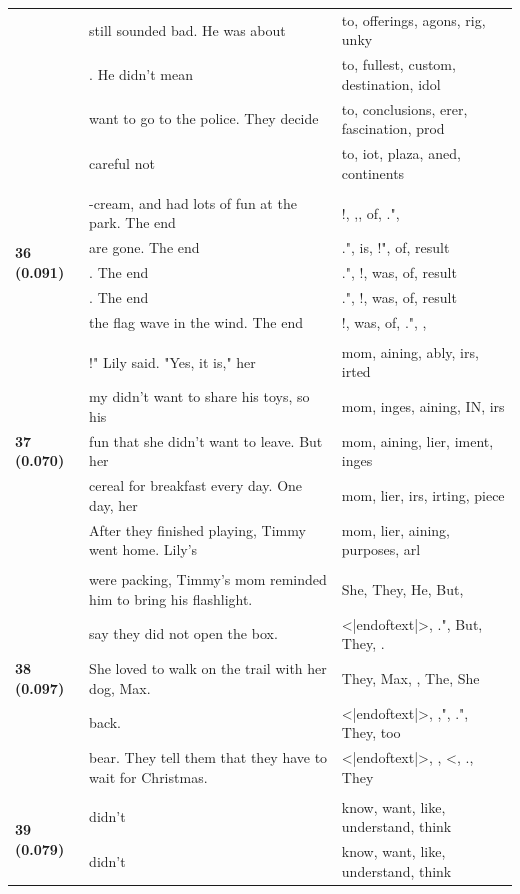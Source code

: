 \documentclass{article}
\theoremstyle{plain}
\theoremstyle{definition}
\theoremstyle{remark}
\begin{document}
\begin{longtable}{|p{}|p{}|p{}|}
& still sounded bad. He was about & to,  offerings, agons, rig, unky \\
& . He didn't mean & to,  fullest,  custom,  destination,  idol \\
& want to go to the police. They decide & to,  conclusions, erer,  fascination,  prod \\
& careful not & to, iot,  plaza, aned,  continents \\
& & \\
\multirow{5}{*}{\textbf{36 (0.091)}} & -cream, and had lots of fun at the park. The end & !, ,,  of, .", \\
& are gone. The end & .",  is, !",  of,  result \\
& . The end & .", !,  was,  of,  result \\
& . The end & .", !,  was,  of,  result \\
& the flag wave in the wind. The end & !,  was,  of, .", , \\
& & \\
\multirow{5}{*}{\textbf{37 (0.070)}} & !" Lily said. "Yes, it is," her & mom, aining, ably, irs, irted \\
& my didn't want to share his toys, so his & mom, inges, aining, IN, irs \\
& fun that she didn't want to leave. But her & mom, aining, lier, iment, inges \\
& cereal for breakfast every day. One day, her & mom, lier, irs, irting, piece \\
& After they finished playing, Timmy went home. Lily's & mom, lier, aining,  purposes, arl \\
& & \\
\multirow{5}{*}{\textbf{38 (0.097)}} & were packing, Timmy's mom reminded him to bring his flashlight. & She,  They,  He,  But, \\
& say they did not open the box. & <|endoftext|>, .", But,  They, . \\
& She loved to walk on the trail with her dog, Max. & They,  Max,  ,  The,  She \\
& back. & <|endoftext|>, ,", .",  They,  too \\
& bear. They tell them that they have to wait for Christmas. & <|endoftext|>,  , <, .,  They \\
& & \\
\multirow{5}{*}{\textbf{39 (0.079)}} & didn't & know,  want,  like,  understand,  think \\
& didn't & know,  want,  like,  understand,  think \\

\end{longtable}
\end{document}
